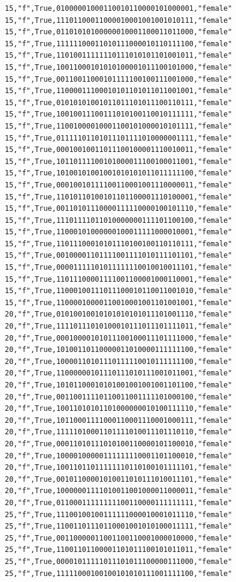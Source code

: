 \documentclass[authoryearcitations]{UoYCSproject}
\begin{document}
\begin{framed}
\begin{verbatim}
15,"f",True,01000001000110010110000101000001,"female"
15,"f",True,11101100011000010001001001010111,"female"
15,"f",True,01101010100000010001100011011000,"female"
15,"f",True,11111100011010111000010110111100,"female"
15,"f",True,11010011111110111010101101001011,"female"
15,"f",True,10011000101010100001011100101000,"female"
15,"f",True,00110011000101111100100111001000,"female"
15,"f",True,11000011100010101101011011001001,"female"
15,"f",True,01010101001011011101011100110111,"female"
15,"f",True,10010011100111010100110010111111,"female"
15,"f",True,11001000010001100101000010101111,"female"
15,"f",True,01111101101011101111010000001111,"female"
15,"f",True,00010010011011100100001110010011,"female"
15,"f",True,10110111100101000011100100011001,"female"
15,"f",True,10100101001001010101011011111100,"female"
15,"f",True,00010010111100110001001110000011,"female"
15,"f",True,11010110100101101100001110100001,"female"
15,"f",True,00110101110000111110000100101110,"female"
15,"f",True,11101111011010000000111101100100,"female"
15,"f",True,11000101000000100011111000010001,"female"
15,"f",True,11011100010101110100100110110111,"female"
15,"f",True,00100001101111001111010111101101,"female"
15,"f",True,00001111101011111110010010011101,"female"
15,"f",True,11011100001111001100001000110001,"female"
15,"f",True,11000100111011100010110011001010,"female"
15,"f",True,11000010000110010001001101001001,"female"
20,"f",True,01010010010101010101011101001110,"female"
20,"f",True,11110111010100010111011101111011,"female"
20,"f",True,00010000101011100100011101111000,"female"
20,"f",True,10100110110000011010000111111100,"female"
20,"f",True,10000110101110111110010111111100,"female"
20,"f",True,11000000101110111010111001011001,"female"
20,"f",True,10101100010101001001001001101100,"female"
20,"f",True,00110011110110011001111101000100,"female"
20,"f",True,10011010101101000000010100111110,"female"
20,"f",True,10110001111000110001110001000111,"female"
20,"f",True,11111010001101111010011101110110,"female"
20,"f",True,00011010111010100110000101100010,"female"
20,"f",True,10000100000111111110001101100010,"female"
20,"f",True,10011011011111110110100101111101,"female"
20,"f",True,00101100001010011010111010011101,"female"
20,"f",True,10000001111010011001000011000011,"female"
20,"f",True,01100011111111100110000111111111,"female"
25,"f",True,11100100100111111000010001011110,"female"
25,"f",True,11001101110110001001010100011111,"female"
25,"f",True,00110000011001100110001000010000,"female"
25,"f",True,11001101100001101011100101011011,"female"
25,"f",True,00001011111011101011100000111000,"female"
25,"f",True,11111000100100101010111001111100,"female"

\end{verbatim}
\end{framed}
\end{document}
